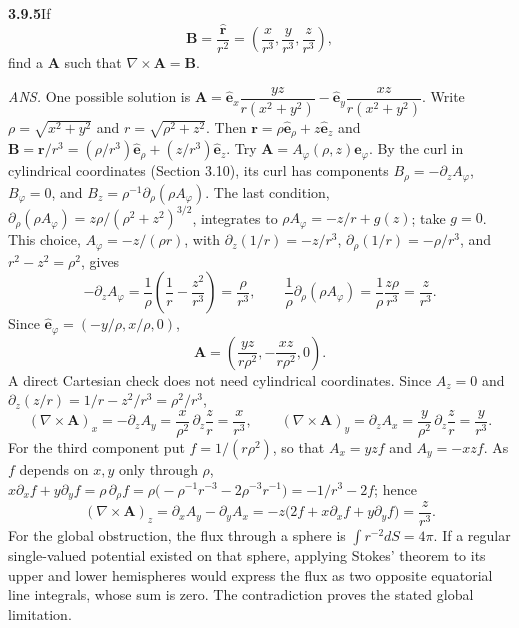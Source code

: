 \par\bigskip
\noindent\textbf{3.9.5}\quad If
\[
\mathbf{B}=\frac{\hat{\mathbf{r}}}{r^{2}}
=\left(\frac{x}{r^{3}},\frac{y}{r^{3}},\frac{z}{r^{3}}\right),
\]
find a  $\mathbf{A}$ such that $\nabla\times\mathbf{A}=\mathbf{B}$.
\par\nobreak\hfill\emph{ANS.}\enspace
One possible solution is
$\mathbf{A}=\hat{\mathbf{e}}_{x}\dfrac{yz}{r(x^{2}+y^{2})}
-\hat{\mathbf{e}}_{y}\dfrac{xz}{r(x^{2}+y^{2})}$.
\solution
{}
Write $\rho=\sqrt{x^2+y^2}$ and $r=\sqrt{\rho^2+z^2}$.
Then $\mathbf r=\rho\hat{\mathbf e}_\rho+z\hat{\mathbf e}_z$ and
$\mathbf B=\mathbf r/r^3=(\rho/r^3)\hat{\mathbf e}_\rho+
(z/r^3)\hat{\mathbf e}_z$.
Try $\mathbf A=A_\varphi(\rho,z)\hat{\mathbf e}_\varphi$.
By the curl in cylindrical coordinates (Section 3.10), its curl has
components $B_\rho=-\partial_zA_\varphi$, $B_\varphi=0$, and
$B_z=\rho^{-1}\partial_\rho(\rho A_\varphi)$.
The last condition,
$\partial_\rho(\rho A_\varphi)=z\rho/(\rho^2+z^2)^{3/2}$, integrates to
$\rho A_\varphi=-z/r+g(z)$; take $g=0$.
This choice, $A_\varphi=-z/(\rho r)$, with $\partial_z(1/r)=-z/r^3$,
$\partial_\rho(1/r)=-\rho/r^3$, and $r^2-z^2=\rho^2$, gives
\[
-\partial_zA_\varphi=\frac1\rho\left(\frac1r-\frac{z^2}{r^3}\right)
=\frac{\rho}{r^3},\qquad
\frac1\rho\partial_\rho(\rho A_\varphi)
=\frac1\rho\frac{z\rho}{r^3}=\frac z{r^3}.
\]
Since $\hat{\mathbf e}_\varphi=(-y/\rho,x/\rho,0)$,
\[
\boxed{\mathbf A=\left(\frac{yz}{r\rho^2},-\frac{xz}{r\rho^2},0\right)}.
\]
A direct Cartesian check does not need cylindrical coordinates. Since
$A_z=0$ and $\partial_z(z/r)=1/r-z^2/r^3=\rho^2/r^3$,
\[
(\nabla\times\mathbf A)_x=-\partial_zA_y
=\frac x{\rho^2}\,\partial_z\frac zr=\frac x{r^3},\qquad
(\nabla\times\mathbf A)_y=\partial_zA_x
=\frac y{\rho^2}\,\partial_z\frac zr=\frac y{r^3}.
\]
For the third component put $f=1/(r\rho^2)$, so that $A_x=yzf$ and
$A_y=-xzf$. As $f$ depends on $x,y$ only through $\rho$,
$x\partial_xf+y\partial_yf=\rho\,\partial_\rho f
=\rho\bigl(-\rho^{-1}r^{-3}-2\rho^{-3}r^{-1}\bigr)=-1/r^3-2f$; hence
\[
(\nabla\times\mathbf A)_z=\partial_xA_y-\partial_yA_x
=-z\bigl(2f+x\partial_xf+y\partial_yf\bigr)=\frac z{r^3}.
\]
For the global obstruction, the flux through a sphere is
$\int r^{-2}dS=4\pi$. If a regular single-valued potential existed
on that sphere, applying Stokes' theorem to its upper and lower
hemispheres would express the flux as two opposite equatorial line
integrals, whose sum is zero. The contradiction proves the stated
global limitation.

